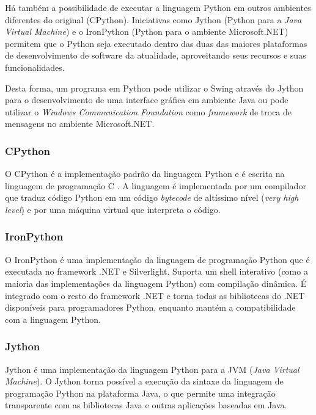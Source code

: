 Há também a possibilidade de executar a linguagem Python em outros ambientes diferentes do original (CPython). Iniciativas como Jython (Python para a \emph{Java Virtual Machine}) e o IronPython (Python para o ambiente Microsoft.NET) permitem que o Python seja executado dentro das duas das maiores plataformas de desenvolvimento de software da atualidade, aproveitando seus recursos e suas funcionalidades. 

Desta forma, um programa em Python pode utilizar o Swing através do Jython para o desenvolvimento de uma interface gráfica em ambiente Java ou pode utilizar o \emph{Windows Communication Foundation} como \emph{framework} de troca de mensagens no ambiente Microsoft.NET.

\subsubsection{CPython}

O CPython é a implementação padrão da linguagem Python e é escrita na linguagem de programação C \cite[p.6]{pypy}. A linguagem é implementada por um compilador que traduz código Python em um código \emph{bytecode} de altíssimo nível (\emph{very high level}) e por uma máquina virtual que interpreta o código.

\subsubsection{IronPython}

O IronPython \cite{ironpython} é uma implementação da linguagem de programação Python que é executada no framework .NET e Silverlight. Suporta um shell interativo (como a maioria das implementações da linguagem Python) com compilação dinâmica. É integrado com o resto do framework .NET e torna todas as bibliotecas do .NET disponíveis para programadores Python, enquanto mantém a compatibilidade com a linguagem Python.

\subsubsection{Jython}

Jython \cite{jython} é uma implementação da linguagem Python para a JVM (\emph{Java Virtual Machine}). O Jython torna possível a execução da sintaxe da linguagem de programação Python na plataforma Java, o que permite uma integração transparente com as bibliotecas Java e outras aplicações baseadas em Java. 

